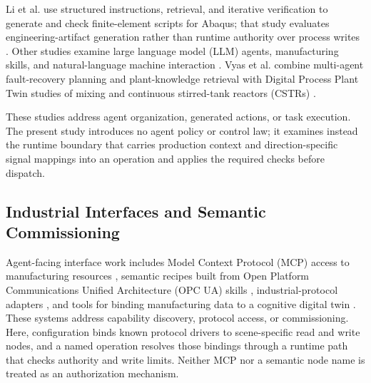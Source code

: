 Li et al. use structured instructions, retrieval, and iterative verification to generate and check finite-element scripts for Abaqus; that study evaluates engineering-artifact generation rather than runtime authority over process writes \cite{li2026modsolagent}. Other studies examine large language model (LLM) agents, manufacturing skills, and natural-language machine interaction \cite{koehle2026llmdriven,lim2025llmenabled,zhao2026shopfloor,hofmann2025nlc}. Vyas et al. combine multi-agent fault-recovery planning and plant-knowledge retrieval with Digital Process Plant Twin studies of mixing and continuous stirred-tank reactors (CSTRs) \cite{vyas2026detection}.

These studies address agent organization, generated actions, or task execution. The present study introduces no agent policy or control law; it examines instead the runtime boundary that carries production context and direction-specific signal mappings into an operation and applies the required checks before dispatch.

\subsection{Industrial Interfaces and Semantic Commissioning}
Agent-facing interface work includes Model Context Protocol (MCP) access to manufacturing resources \cite{silva2025mcpmanufacturing}, semantic recipes built from Open Platform Communications Unified Architecture (OPC UA) skills \cite{koehle2025semanticrecipes}, industrial-protocol adapters \cite{xavier2026industriConnect}, and tools for binding manufacturing data to a cognitive digital twin \cite{liu2026semanticcommissioning}. These systems address capability discovery, protocol access, or commissioning. Here, configuration binds known protocol drivers to scene-specific read and write nodes, and a named operation resolves those bindings through a runtime path that checks authority and write limits. Neither MCP nor a semantic node name is treated as an authorization mechanism.

